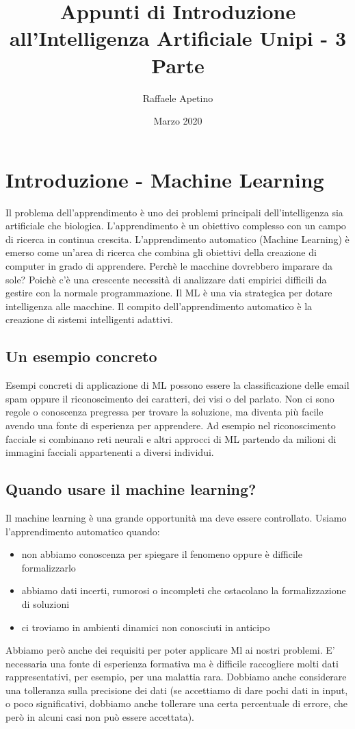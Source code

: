 \documentclass{article}
\title{Appunti di Introduzione all'Intelligenza Artificiale Unipi - 3 Parte}
\author{Raffaele Apetino}
\date{Marzo 2020}
\begin{document}
\maketitle

\tableofcontents{}
\clearpage

\section{Introduzione - Machine Learning}
Il problema dell'apprendimento è uno dei problemi principali dell'intelligenza sia artificiale che biologica. L'apprendimento è un obiettivo complesso con un campo di ricerca in continua crescita. L'apprendimento automatico (Machine Learning) è emerso come un'area di ricerca che combina gli obiettivi della creazione di computer in grado di apprendere. Perchè le macchine dovrebbero imparare da sole? Poichè c'è una crescente necessità di analizzare dati empirici difficili da gestire con la normale programmazione. Il ML è una via strategica per dotare intelligenza alle macchine. Il compito dell'apprendimento automatico è la creazione di sistemi intelligenti adattivi.

\subsection{Un esempio concreto}
Esempi concreti di applicazione di ML possono essere la classificazione delle email spam oppure il riconoscimento dei caratteri, dei visi o del parlato. Non ci sono regole o conoscenza pregressa per trovare la soluzione, ma diventa più facile avendo una fonte di esperienza per apprendere. Ad esempio nel riconoscimento facciale si combinano reti neurali e altri approcci di ML partendo da milioni di immagini facciali appartenenti a diversi individui. 

\subsection{Quando usare il machine learning?}
Il machine learning è una grande opportunità ma deve essere controllato. Usiamo l'apprendimento automatico quando:
\begin{itemize}
    \item non abbiamo conoscenza per spiegare il fenomeno oppure è difficile formalizzarlo
    \item abbiamo dati incerti, rumorosi o incompleti che ostacolano la formalizzazione di soluzioni
    \item ci troviamo in ambienti dinamici non conosciuti in anticipo
\end{itemize}
Abbiamo però anche dei requisiti per poter applicare Ml ai nostri problemi. E' necessaria una fonte di esperienza formativa ma è difficile raccogliere molti dati rappresentativi, per esempio, per una malattia rara. Dobbiamo anche considerare una tolleranza sulla precisione dei dati (se accettiamo di dare pochi dati in input, o poco significativi, dobbiamo anche tollerare una certa percentuale di errore, che però in alcuni casi non può essere accettata).
\end{document}
